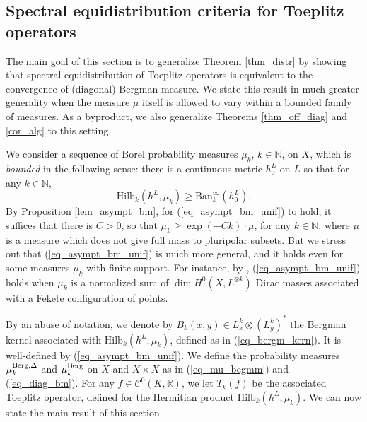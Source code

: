 \documentclass[12pt]{article}
\numberwithin{equation}{section}
\theoremstyle{theorem}
\theoremstyle{definition}
\theoremstyle{remark}
\newcommand{\real}{\mathbb{R}}
\newcommand{\nat}{\mathbb{N}}
\newcommand{\ccal}{\mathscr{C}}
\begin{document}
	\subsection{Spectral equidistribution criteria for Toeplitz operators}\label{sect_toepl_eq}
	The main goal of this section is to generalize Theorem \ref{thm_distr} by showing that spectral equidistribution of Toeplitz operators is equivalent to the convergence of (diagonal) Bergman measure.
	We state this result in much greater generality when the measure $\mu$ itself is allowed to vary within a bounded family of measures.
	As a byproduct, we also generalize Theorems \ref{thm_off_diag} and \ref{cor_alg} to this setting.
	\par 
	We consider a sequence of Borel probability measures $\mu_k$, $k \in \nat$, on $X$, which is \textit{bounded} in the following sense: there is a continuous metric $h^L_0$ on $L$ so that for any $k \in \nat$,
	\begin{equation}\label{eq_asympt_bm_unif}
		{\textrm{Hilb}}_k(h^L, \mu_k)
		\geq
		{\textrm{Ban}}_k^{\infty}(h^L_0).
	\end{equation}
	By Proposition \ref{lem_asympt_bm}, for (\ref{eq_asympt_bm_unif}) to hold, it suffices that there is $C > 0$, so that $\mu_k \geq \exp(- C k) \cdot \mu$, for any $k \in \nat$, where $\mu$ is a measure which does not give full mass to pluripolar subsets.
	But we stress out that (\ref{eq_asympt_bm_unif}) is much more general, and it holds even for some measures $\mu_k$ with finite support.
	For instance, by \cite[Proposition 2.10]{BerBoucNys}, (\ref{eq_asympt_bm_unif}) holds when $\mu_k$ is a normalized sum of $\dim H^0(X, L^{\otimes k})$ Dirac masses associated with a Fekete configuration of points.
	\par 
	By an abuse of notation, we denote by $B_k(x, y) \in L^k_x \otimes (L^k_y)^*$ the Bergman kernel associated with ${\textrm{Hilb}}_k(h^L, \mu_k)$, defined as in (\ref{eq_bergm_kern}).
	It is well-defined by (\ref{eq_asympt_bm_unif}).
	We define the probability measures $\mu_{k}^{\rm{Berg}, \Delta}$ and $\mu_{k}^{\rm{Berg}}$ on $X$ and $X \times X$ as in (\ref{eq_mu_begmm}) and (\ref{eq_diag_bm}).
	For any $f \in \ccal^0(K, \real)$, we let $T_k(f)$ be the associated Toeplitz operator, defined for the Hermitian product ${\textrm{Hilb}}_k(h^L, \mu_k)$.
	We can now state the main result of this section.
\end{document}
